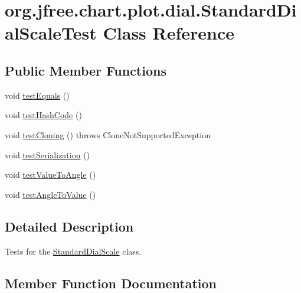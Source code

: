 \hypertarget{classorg_1_1jfree_1_1chart_1_1plot_1_1dial_1_1_standard_dial_scale_test}{}\section{org.\+jfree.\+chart.\+plot.\+dial.\+Standard\+Dial\+Scale\+Test Class Reference}
\label{classorg_1_1jfree_1_1chart_1_1plot_1_1dial_1_1_standard_dial_scale_test}
\subsection*{Public Member Functions}
\begin{DoxyCompactItemize}
\item 
void \mbox{\hyperlink{classorg_1_1jfree_1_1chart_1_1plot_1_1dial_1_1_standard_dial_scale_test_a2a047fabefecd66be7083baa652e7cfb}{test\+Equals}} ()
\item 
void \mbox{\hyperlink{classorg_1_1jfree_1_1chart_1_1plot_1_1dial_1_1_standard_dial_scale_test_a9fa13acd3e3566e2d5bba8c0747be68e}{test\+Hash\+Code}} ()
\item 
void \mbox{\hyperlink{classorg_1_1jfree_1_1chart_1_1plot_1_1dial_1_1_standard_dial_scale_test_a91f4315cb32917155971a91ef0c0d47b}{test\+Cloning}} ()  throws Clone\+Not\+Supported\+Exception 
\item 
void \mbox{\hyperlink{classorg_1_1jfree_1_1chart_1_1plot_1_1dial_1_1_standard_dial_scale_test_a5ca45517f63c3ca7f9d77ddbaa8a1d56}{test\+Serialization}} ()
\item 
void \mbox{\hyperlink{classorg_1_1jfree_1_1chart_1_1plot_1_1dial_1_1_standard_dial_scale_test_abfb6dc49d1aee4437edd5ad66be6fb4e}{test\+Value\+To\+Angle}} ()
\item 
void \mbox{\hyperlink{classorg_1_1jfree_1_1chart_1_1plot_1_1dial_1_1_standard_dial_scale_test_a187bda5c110dcebde4b4fdbb2627ef7a}{test\+Angle\+To\+Value}} ()
\end{DoxyCompactItemize}


\subsection{Detailed Description}
Tests for the \mbox{\hyperlink{classorg_1_1jfree_1_1chart_1_1plot_1_1dial_1_1_standard_dial_scale}{Standard\+Dial\+Scale}} class. 

\subsection{Member Function Documentation}
\mbox{\label{classorg_1_1jfree_1_1chart_1_1plot_1_1dial_1_1_standard_dial_scale_test_a187bda5c110dcebde4b4fdbb2627ef7a}} 
